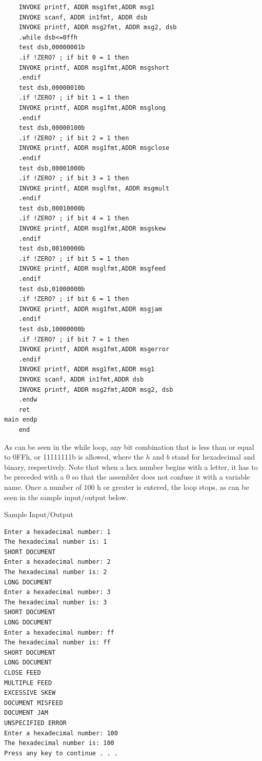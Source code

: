 \documentclass[10pt]{book}
\begin{document}
\begin{verbatim}
    INVOKE printf, ADDR msg1fmt,ADDR msg1
    INVOKE scanf, ADDR in1fmt, ADDR dsb
    INVOKE printf, ADDR msg2fmt, ADDR msg2, dsb
    .while dsb<=0ffh
    test dsb,00000001b
    .if !ZERO? ; if bit 0 = 1 then
    INVOKE printf, ADDR msg1fmt,ADDR msgshort
    .endif
    test dsb,00000010b
    .if !ZERO? ; if bit 1 = 1 then
    INVOKE printf, ADDR msg1fmt,ADDR msglong
    .endif
    test dsb,00000100b
    .if !ZERO? ; if bit 2 = 1 then
    INVOKE printf, ADDR msg1fmt,ADDR msgclose
    .endif
    test dsb,00001000b
    .if !ZERO? ; if bit 3 = 1 then
    INVOKE printf, ADDR msglfmt, ADDR msgmult
    .endif
    test dsb,00010000b
    .if !ZERO? ; if bit 4 = 1 then
    INVOKE printf, ADDR msg1fmt,ADDR msgskew
    .endif
    test dsb,00100000b
    .if !ZERO? ; if bit 5 = 1 then
    INVOKE printf, ADDR msglfmt,ADDR msgfeed
    .endif
    test dsb,01000000b
    .if !ZERO? ; if bit 6 = 1 then
    INVOKE printf, ADDR msg1fmt,ADDR msgjam
    .endif
    test dsb,10000000b
    .if !ZERO? ; if bit 7 = 1 then
    INVOKE printf, ADDR msg1fmt,ADDR msgerror
    .endif
    INVOKE printf, ADDR msg1fmt,ADDR msg1
    INVOKE scanf, ADDR in1fmt,ADDR dsb
    INVOKE printf, ADDR msg2fmt,ADDR msg2, dsb
    .endw
    ret
main endp
    end
\end{verbatim}

As can be seen in the while loop, any bit combination that is less than or equal to 0FFh, or 11111111b is allowed, where the $h$ and $b$ stand for hexadecimal and binary, respectively. Note that when a hex number begins with a letter, it has to be preceded with a 0 so that the assembler does not confuse it with a variable name. Once a number of 100 h or greater is entered, the loop stops, as can be seen in the sample input/output below.

Sample Input/Output
\begin{verbatim}
Enter a hexadecimal number: 1
The hexadecimal number is: 1
SHORT DOCUMENT
Enter a hexadecimal number: 2
The hexadecimal number is: 2
LONG DOCUMENT
Enter a hexadecimal number: 3
The hexadecimal number is: 3
SHORT DOCUMENT
LONG DOCUMENT
Enter a hexadecimal number: ff
The hexadecimal number is: ff
SHORT DOCUMENT
LONG DOCUMENT
CLOSE FEED
MULTIPLE FEED
EXCESSIVE SKEW
DOCUMENT MISFEED
DOCUMENT JAM
UNSPECIFIED ERROR
Enter a hexadecimal number: 100
The hexadecimal number is: 100
Press any key to continue . . .
\end{verbatim}
\end{document}
